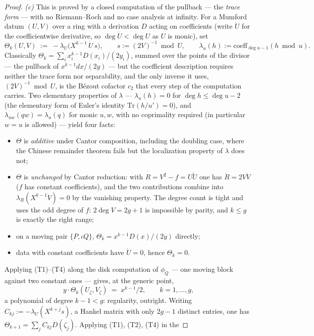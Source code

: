 \begin{proof}
\emph{(c)} This is proved by a closed computation of the pullback --- the \emph{trace
form} --- with no Riemann--Roch and no case analysis at infinity. For a Mumford datum
$(U,V)$ over a ring with a derivation $D$ acting on coefficients (write $\dot U$ for
the coefficientwise derivative, so $\deg \dot U < \deg U$ as $U$ is monic), set
\[
  \Theta_k(U,V) \;:=\; -\lambda_U\bigl(X^{k-1}\,\dot U\,s\bigr), \qquad
  s := (2V)^{-1} \bmod U, \qquad
  \lambda_u(h) := \mathrm{coeff}_{\deg u - 1}(h \bmod u).
\]
Classically $\Theta_k = \sum_i x_i^{k-1}D(x_i)/(2y_i)$, summed over the points of the
divisor --- the pullback of $x^{k-1}dx/(2y)$ --- but the coefficient description
requires neither the trace form nor separability, and the only inverse it uses,
$(2V)^{-1} \bmod U$, is the B\'ezout cofactor $c_2$ that every step of the computation
carries. Two elementary properties of $\lambda$ --- $\lambda_u(h) = 0$ for
$\deg h \le \deg u - 2$ (the elementary form of Euler's identity
$\mathrm{Tr}(h/u') = 0$), and $\lambda_{uw}(qw) = \lambda_u(q)$ for monic $u, w$, with
no coprimality required (in particular $w = u$ is allowed) --- yield four facts:
\begin{itemize}
\item[(T1)] $\Theta$ is \emph{additive} under Cantor composition, including the
doubling case, where the Chinese remainder theorem fails but the localization property
of $\lambda$ does not;
\item[(T2)] $\Theta$ is \emph{unchanged} by Cantor reduction: with
$R = V^2 - f = U\widetilde U$ one has $\dot R = 2V\dot V$ ($f$ has constant
coefficients), and the two contributions combine into
$\lambda_R(X^{k-1}\dot V) = 0$ by the vanishing property. The degree count is tight and
uses the odd degree of $f$: $2\deg V = 2g+1$ is impossible by parity, and $k \le g$ is
exactly the right range;
\item[(T3)] on a moving pair $\{P, \iota Q\}$, $\Theta_k = x^{k-1}D(x)/(2y)$ directly;
\item[(T4)] data with constant coefficients have $\dot U = 0$, hence $\Theta_k = 0$.
\end{itemize}
Applying (T1)--(T4) along the disk computation of $\phi_Q$ --- one moving block against
two constant ones --- gives, at the generic point,
\[
  y \cdot \Theta_k(U_\zeta, V_\zeta) \;=\; x^{k-1}/2, \qquad k = 1,\dots,g,
\]
a polynomial of degree $k-1 < g$: regularity, outright. Writing
$C_{kj} := -\lambda_{U}(X^{k+j}s)$, a Hankel matrix with only $2g-1$ distinct entries,
one has $\Theta_{k+1} = \sum_j C_{kj}D(\zeta_j)$. Applying (T1), (T2), (T4) in the

\end{proof}

